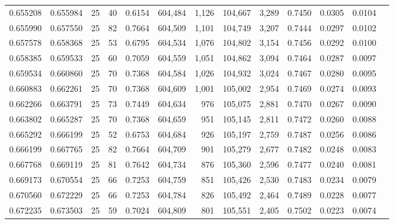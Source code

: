 \begin{tabular}{rrrrrrrrrrrrr}
0.655208 & 0.655984 &    25 &  40 &                                     0.6154 & 604,484 &   1,126 & 104,667 &   3,289 & 0.7450 & 0.0305 & 0.0104 \\
0.655990 & 0.657550 &    25 &  82 &                                     0.7664 & 604,509 &   1,101 & 104,749 &   3,207 & 0.7444 & 0.0297 & 0.0102 \\
0.657578 & 0.658368 &    25 &  53 &                                     0.6795 & 604,534 &   1,076 & 104,802 &   3,154 & 0.7456 & 0.0292 & 0.0100 \\
0.658385 & 0.659533 &    25 &  60 &                                     0.7059 & 604,559 &   1,051 & 104,862 &   3,094 & 0.7464 & 0.0287 & 0.0097 \\
0.659534 & 0.660860 &    25 &  70 &                                     0.7368 & 604,584 &   1,026 & 104,932 &   3,024 & 0.7467 & 0.0280 & 0.0095 \\
0.660883 & 0.662261 &    25 &  70 &                                     0.7368 & 604,609 &   1,001 & 105,002 &   2,954 & 0.7469 & 0.0274 & 0.0093 \\
0.662266 & 0.663791 &    25 &  73 &                                     0.7449 & 604,634 &     976 & 105,075 &   2,881 & 0.7470 & 0.0267 & 0.0090 \\
0.663802 & 0.665287 &    25 &  70 &                                     0.7368 & 604,659 &     951 & 105,145 &   2,811 & 0.7472 & 0.0260 & 0.0088 \\
0.665292 & 0.666199 &    25 &  52 &                                     0.6753 & 604,684 &     926 & 105,197 &   2,759 & 0.7487 & 0.0256 & 0.0086 \\
0.666199 & 0.667765 &    25 &  82 &                                     0.7664 & 604,709 &     901 & 105,279 &   2,677 & 0.7482 & 0.0248 & 0.0083 \\
0.667768 & 0.669119 &    25 &  81 &                                     0.7642 & 604,734 &     876 & 105,360 &   2,596 & 0.7477 & 0.0240 & 0.0081 \\
0.669173 & 0.670554 &    25 &  66 &                                     0.7253 & 604,759 &     851 & 105,426 &   2,530 & 0.7483 & 0.0234 & 0.0079 \\
0.670560 & 0.672229 &    25 &  66 &                                     0.7253 & 604,784 &     826 & 105,492 &   2,464 & 0.7489 & 0.0228 & 0.0077 \\
0.672235 & 0.673503 &    25 &  59 &                                     0.7024 & 604,809 &     801 & 105,551 &   2,405 & 0.7502 & 0.0223 & 0.0074 \\

\end{tabular}
